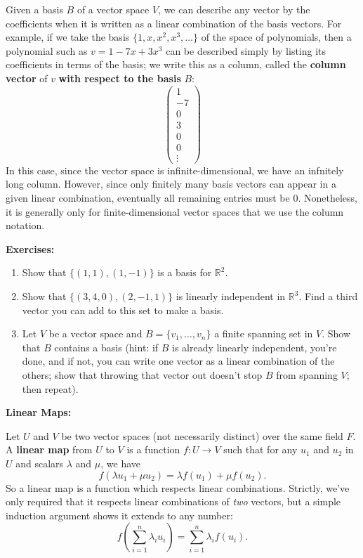 \documentclass{article}
\begin{document}
Given a basis $B$ of a vector space $V$, we can describe any vector by the coefficients when it is written as a linear combination of the basis vectors. For example, if we take the basis $\{1,x,x^2,x^3,\hdots\}$ of the space of polynomials, then a polynomial such as $v=1-7x+3x^3$ can be described simply by listing its coefficients in terms of the basis; we write this as a column, called the \textbf{column vector} of $v$ \textbf{with respect to the basis} $B$:
\[\left(\begin{array}{c} 1\\-7\\0\\3\\0\\0\\ \vdots\end{array}\right)\]
In this case, since the vector space is infinite-dimensional, we have an infnitely long column. However, since only finitely many basis vectors can appear in a given linear combination, eventually all remaining entries must be 0. Nonetheless, it is generally only for finite-dimensional vector spaces that we use the column notation.\bigskip



\textbf{Exercises:}

\begin{enumerate}
	\item Show that $\{(1,1),(1,-1)\}$ is a basis for $\mathbb{R}^2$.
	\item Show that $\{(3,4,0),(2,-1,1)\}$ is linearly independent in $\mathbb{R}^3$. Find a third vector you can add to this set to make a basis.
	\item Let $V$ be a vector space and $B=\{v_1,\hdots,v_n\}$ a finite spanning set in $V$. Show that $B$ contains a basis (hint: if $B$ is already linearly independent, you're done, and if not, you can write one vector as a linear combination of the others; show that throwing that vector out doesn't stop $B$ from spanning $V$; then repeat).
\end{enumerate}



\textbf{Linear Maps:}\bigskip

Let $U$ and $V$ be two vector spaces (not necessarily distinct) over the same field $F$. A \textbf{linear map} from $U$ to $V$ is a function $f:U\to V$ such that for any $u_1$ and $u_2$ in $U$ and scalars $\lambda$ and $\mu$, we have
\[f(\lambda u_1+\mu u_2)=\lambda f(u_1)+\mu f(u_2).\]
So a linear map is a function which respects linear combinations. Strictly, we've only required that it respects linear combinations of \textit{two} vectors, but a simple induction argument shows it extends to any number:
\[f\left(\sum_{i=1}^n \lambda_i u_i\right)=\sum_{i=1}^n \lambda_i f(u_i).\]
\end{document}
